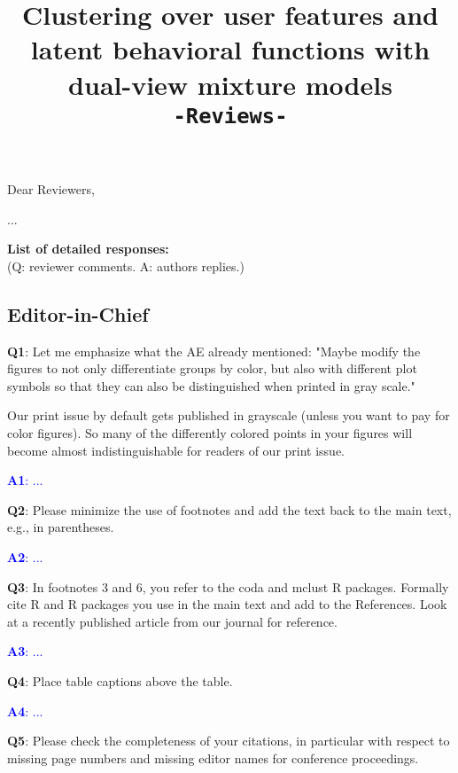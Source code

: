 \documentclass[]{article}
\title{Clustering over user features and latent behavioral functions with dual-view mixture models \\ \texttt{-Reviews-}}
\author{}
\begin{document}
	\date{}
	\maketitle
	
	Dear Reviewers,
	
	...
	
	\bigskip
	\noindent
	\textbf{List of detailed responses:}\\
	(Q: reviewer comments.
	A: authors replies.)
	\subsection*{Editor-in-Chief}
	
	\vspace{3mm}	
	 \textbf{Q1}: Let me emphasize what the AE already mentioned: "Maybe modify the figures to not only differentiate groups by color, but also with different plot symbols so that they can also be distinguished when printed in gray scale."

Our print issue by default gets published in grayscale (unless you want to pay for color figures). So many of the differently colored points in your figures will become almost indistinguishable for readers of our print issue.
		
		\textcolor{blue}{  \textbf{A1}: ...} 
	\vspace{3mm}	

	\textbf{Q2}: Please minimize the use of footnotes and add the text back to the main text, e.g., in parentheses.
		
		\textcolor{blue}{  \textbf{A2}: ...} 

	\vspace{3mm}	
		
\textbf{Q3}:  In footnotes 3 and 6, you refer to the coda and mclust R packages. Formally cite R and R packages you use in the main text and add to the References. Look at a recently published article from our journal for reference.
		
		\textcolor{blue}{  \textbf{A3}: ...} 

	\vspace{3mm}	

\textbf{Q4}:  Place table captions above the table.

		\textcolor{blue}{  \textbf{A4}: ...} 

	\vspace{3mm}	

\textbf{Q5}: Please check the completeness of your citations, in particular with respect to missing page numbers and missing editor names for conference proceedings.
		
\end{document}
